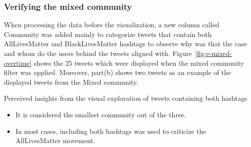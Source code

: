 \subsubsection{Verifying the mixed community}

When processing the data before the visualization, a new column called Community was added mainly to categorize tweets that contain both AllLivesMatter and BlackLivesMatter hashtags to observe why was that the case and whom do the users behind the tweets aligned with. Figure~\ref{fig:e-mixed-overtime} shows the 25 tweets which were displayed when the mixed community filter was applied. Moreover, part(b) shows two tweets as an example of the displayed tweets from the Mixed community. 


Perceived insights from the visual exploration of tweets containing both hashtags

\begin{itemize}
    \item It is considered the smallest community out of the three.
    \item In most cases, including both hashtags was used to criticize the AllLivesMatter movement.
    
\end{itemize}

